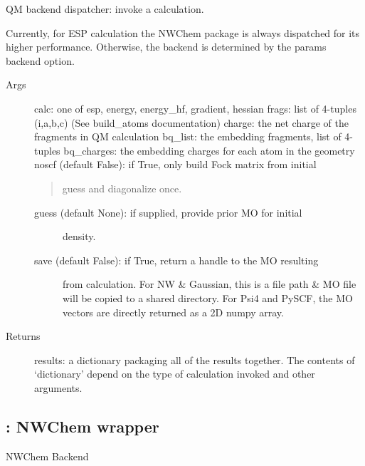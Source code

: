 \documentclass[letterpaper,10pt,english]{sphinxmanual}
\begin{document}
\begin{fulllineitems}
\label{\detokenize{backend:backend.backend.run}}
QM backend dispatcher: invoke a calculation.

Currently, for ESP calculation the NWChem package is always dispatched
for its higher performance.  Otherwise, the backend is determined by the
params backend option.
\begin{description}
\item[{Args}] \leavevmode
calc: one of esp, energy, energy\_hf, gradient, hessian
frags: list of 4-tuples (i,a,b,c) (See build\_atoms documentation)
charge: the net charge of the fragments in QM calculation
bq\_list: the embedding fragments, list of 4-tuples
bq\_charges: the embedding charges for each atom in the geometry
noscf (default False): if True, only build Fock matrix from initial
\begin{quote}

guess and diagonalize once.
\end{quote}
\begin{description}
\item[{guess (default None): if supplied, provide prior MO for initial}] \leavevmode
density.

\item[{save (default False): if True, return a handle to the MO resulting}] \leavevmode
from calculation.  For NW \& Gaussian, this is a file path \& MO file
will be copied to a shared directory.  For Psi4 and PySCF, the MO
vectors are directly returned as a 2D numpy array.

\end{description}

\item[{Returns}] \leavevmode
results: a dictionary packaging all of the results together. The
contents of `dictionary' depend on the type of calculation invoked and
other arguments.

\end{description}

\end{fulllineitems}



\subsection{: NWChem wrapper}
\label{\detokenize{backend:module-backend.nw}}\label{\detokenize{backend:nw-nwchem-wrapper}}
NWChem Backend
\end{document}
